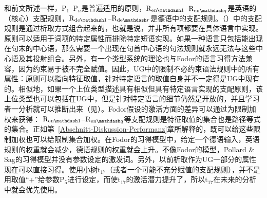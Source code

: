 和前文所述一样，P$_1$--P$_n$是普遍适用的原则，$\mathrm{R}_{\mathrm{en}\mathdash1}$--$\mathrm{R}_{\mathrm{en}\mathdash q}$是英语的（核心）支配规则，$\mathrm{R}_{\mathrm{de}\mathdash1}$--$\mathrm{R}_{\mathrm{de}\mathdash r}$是德语中的支配规则。（）中的支配规则是通过析取方式组合起来的，也就是说，并非所有项都要在具体语言中实现。原则可以适用于词项的特定属性而排除特定短语实现。如果一种语言只包括能出现在句末的中心语，那么需要一个出现在句首中心语的句法规则就永远无法与这些中心语及其投射组合。另外，有一个类型系统的理论也与Fodor的语言习得方法兼容，因为约束易于被不完全赋值。因此，UG中的限制不必约束语法规则中的所有属性：原则可以指向特征取值，针对特定语言的取值自身并不一定得是UG中现有的。相似地，如果一个上位类型描述具有相似但具有特定语言实现的支配原则，该上位类型也可以包括在UG中，但是针对特定语言的细节仍然是开放的，并且学习者一分析就可以推断出来（见\citealp[\S~9.2]{AW98a}）。Fodor假设的激活方面的差异可以通过为限制加权来获得： $\mathrm{R}_{\mathrm{en}\mathdash1}$--$\mathrm{R}_{\mathrm{en}\mathdash q}$等支配规则是特征取值的集合也是路径等式的集合。正如第~\ref{Abschnitt-Diskussion-Performanz}章所解释的，既可以给这些限制加权也可以给限制集合加权。在Fodor的习得模型中，给定一个德语输入，英语规则的权重就会减少，德语规则的权重就会上升。不像Fodor的模型，Pollard \& Sag的习得模型并没有参数设定的激发词。另外，以前析取作为UG一部分的属性现在可以直接习得。使用小树t$_{17}$（或者一个可能不充分赋值的支配规则），并不是用取值“+”给参数P$_5$进行设定，而使t$_{17}$的激活潜力提升了，所以t$_{17}$在未来的分析中就会优先使用。
